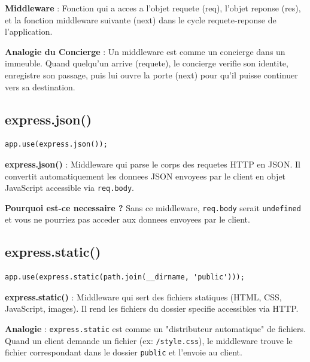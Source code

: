 \documentclass[a4paper,12pt]{book}
\begin{document}
\begin{definitionbox}
    \textbf{Middleware} : Fonction qui a acces a l'objet requete (req), l'objet reponse (res), et la fonction middleware suivante (next) dans le cycle requete-reponse de l'application.
\end{definitionbox}

\begin{analogybox}
    \textbf{Analogie du Concierge} : Un middleware est comme un concierge dans un immeuble. Quand quelqu'un arrive (requete), le concierge verifie son identite, enregistre son passage, puis lui ouvre la porte (next) pour qu'il puisse continuer vers sa destination.
\end{analogybox}

\subsection{express.json()}

\begin{lstlisting}[style=javascript]
app.use(express.json());
\end{lstlisting}

\begin{definitionbox}
    \textbf{express.json()} : Middleware qui parse le corps des requetes HTTP en JSON. Il convertit automatiquement les donnees JSON envoyees par le client en objet JavaScript accessible via \texttt{req.body}.
\end{definitionbox}

\textbf{Pourquoi est-ce necessaire ?}
Sans ce middleware, \texttt{req.body} serait \texttt{undefined} et vous ne pourriez pas acceder aux donnees envoyees par le client.

\subsection{express.static()}

\begin{lstlisting}[style=javascript]
app.use(express.static(path.join(__dirname, 'public')));
\end{lstlisting}

\begin{definitionbox}
    \textbf{express.static()} : Middleware qui sert des fichiers statiques (HTML, CSS, JavaScript, images). Il rend les fichiers du dossier specifie accessibles via HTTP.
\end{definitionbox}

\begin{analogybox}
    \textbf{Analogie} : \texttt{express.static} est comme un "distributeur automatique" de fichiers. Quand un client demande un fichier (ex: \texttt{/style.css}), le middleware trouve le fichier correspondant dans le dossier \texttt{public} et l'envoie au client.
\end{analogybox}
\end{document}
